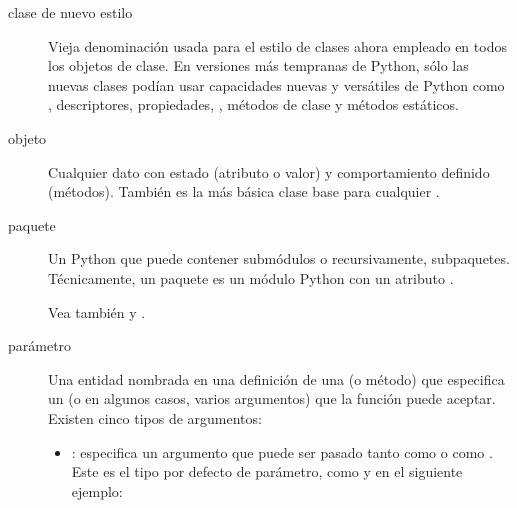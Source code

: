 \documentclass[a4,10pt,spanish]{sphinxmanual}
\begin{document}
\begin{description}
\item[{clase de nuevo estilo\label{\detokenize{glossary:term-new-style-class}}}] \leavevmode
\sphinxAtStartPar
Vieja denominación usada para el estilo de clases ahora empleado en todos los objetos de clase.  En versiones más tempranas de Python, sólo las nuevas clases podían usar capacidades nuevas y versátiles de Python como , descriptores, propiedades, , métodos de clase y métodos estáticos.

\item[{objeto\label{\detokenize{glossary:term-object}}}] \leavevmode
\sphinxAtStartPar
Cualquier dato con estado (atributo o valor) y comportamiento definido (métodos).  También es la más básica clase base para cualquier {\hyperref[\detokenize{glossary:term-new-style-class}]{}}.

\item[{paquete\label{\detokenize{glossary:term-package}}}] \leavevmode
\sphinxAtStartPar
Un {\hyperref[\detokenize{glossary:term-module}]{}} Python que puede contener submódulos o recursivamente, subpaquetes.  Técnicamente, un paquete es un módulo Python con un atributo .

\sphinxAtStartPar
Vea también {\hyperref[\detokenize{glossary:term-regular-package}]{}} y {\hyperref[\detokenize{glossary:term-namespace-package}]{}}.

\item[{parámetro\label{\detokenize{glossary:term-parameter}}}] \leavevmode
\sphinxAtStartPar
Una entidad nombrada en una definición de una {\hyperref[\detokenize{glossary:term-function}]{}} (o método) que especifica un {\hyperref[\detokenize{glossary:term-argument}]{}} (o en algunos casos, varios argumentos) que la función puede aceptar.  Existen cinco tipos de argumentos:
\begin{itemize}
\item {} 
\sphinxAtStartPar
{}: especifica un argumento que puede ser pasado tanto como {\hyperref[\detokenize{glossary:term-argument}]{}} o como {\hyperref[\detokenize{glossary:term-argument}]{}}.  Este es el tipo por defecto de parámetro, como  y  en el siguiente ejemplo:


\end{itemize}
\end{description}
\end{document}
